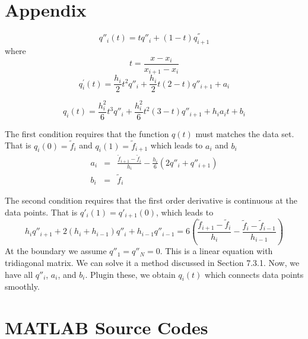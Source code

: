 \newpage

\section*{Appendix}

\label{ap:cubic-spline}


\begin{equation}
q''_{i}(t) = t q''_{i} + (1-t) q^{''}_{i+1}
\end{equation}
where 
\begin{equation}
t=\displaystyle\frac{x-x_{i}}{x_{i+1}-x_{i}}
\end{equation}
\begin{equation}
q^{'}_{i}(t) = \frac{h_i}{2} t^2 q''_{i} + \frac{h_{i}}{2} t (2-t) q''_{i+1} + a_i 
\end{equation}

\begin{equation}
q_{i}(t) = \frac{h_i^2}{6} t^3 q''_{i} + \frac{h_{i}^{2}}{6} t^2 (3-t) q''_{i+1} + h_i a_i t + b_i
\end{equation}

The first condition requires that the function $q(t)$ must matches the data set.  That is $q_i(0)=\tilde{f}_i$ and $q_i(1)=\tilde{f}_{i+1}$ which leads to $a_i$ and $b_i$
\begin{subequations}
\begin{eqnarray}
a_i &=& \frac{\tilde{f}_{i+1} - \tilde{f}_i}{h_i} - \frac{h_i}{6} (2 q''_i + q''_{i+1}) \\
b_i &=& \tilde{f}_i 
\end{eqnarray}
\end{subequations}

The second condition requires that the first order derivative is continuous at the data points.  That is $q'_i(1)=q'_{i+1}(0)$, which leads to
\begin{equation}
h_i q''_{i+1} +2(h_i+h_{i-1}) q''_i + h_{i-1} q''_{i-1}  = 6 \left ( \frac{\tilde{f}_{i+1}-\tilde{f}_i}{h_i}-
\frac{\tilde{f}_i-\tilde{f}_{i-1}}{h_{i-1}} \right )
\end{equation}
At the boundary we assume $q''_1=q''_N=0$.  This is a linear equation with tridiagonal matrix.  We can solve it a method discussed in Section 7.3.1.  Now, we have all $q''_i$, $a_i$, and $b_i$.  Plugin these, we obtain $q_i(t)$ which connects data points smoothly.


\newpage
\noindent
\section*{MATLAB Source Codes}

